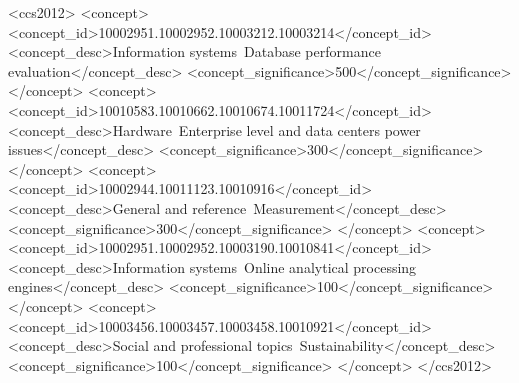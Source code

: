 \documentclass[sigconf]{acmart}
\begin{document}
\begin{CCSXML}
<ccs2012>
<concept>
<concept_id>10002951.10002952.10003212.10003214</concept_id>
<concept_desc>Information systems~Database performance evaluation</concept_desc>
<concept_significance>500</concept_significance>
</concept>
<concept>
<concept_id>10010583.10010662.10010674.10011724</concept_id>
<concept_desc>Hardware~Enterprise level and data centers power issues</concept_desc>
<concept_significance>300</concept_significance>
</concept>
<concept>
<concept_id>10002944.10011123.10010916</concept_id>
<concept_desc>General and reference~Measurement</concept_desc>
<concept_significance>300</concept_significance>
</concept>
<concept>
<concept_id>10002951.10002952.10003190.10010841</concept_id>
<concept_desc>Information systems~Online analytical processing engines</concept_desc>
<concept_significance>100</concept_significance>
</concept>
<concept>
<concept_id>10003456.10003457.10003458.10010921</concept_id>
<concept_desc>Social and professional topics~Sustainability</concept_desc>
<concept_significance>100</concept_significance>
</concept>
</ccs2012>
\end{CCSXML}


\maketitle
\end{document}
